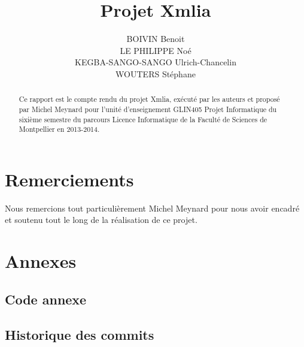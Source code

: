 \documentclass [a4 paper,11pt]{report}
\title {Projet Xmlia}
\author {
BOIVIN Benoit\\
LE PHILIPPE Noé\\
KEGBA-SANGO-SANGO Ulrich-Chancelin\\
WOUTERS Stéphane
}
\begin{document}
\maketitle

\begin{abstract}
Ce rapport est le compte rendu du projet Xmlia, exécuté par les auteurs et proposé par Michel Meynard pour l’unité d’enseignement GLIN405 Projet Informatique du sixième semestre du parcours Licence Informatique de la Faculté de Sciences de Montpellier en 2013-2014.
\end{abstract}

\chapter*{Remerciements}
Nous remercions tout particulièrement Michel Meynard pour nous avoir encadré et soutenu tout le long de la réalisation de ce projet.

\tableofcontents










\chapter{Annexes}

\section{Code annexe}


\section{Historique des commits}
\end{document}
